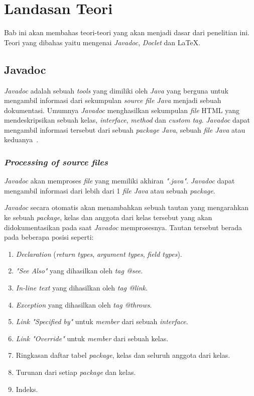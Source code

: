 \lstset{style=mystyle}
\chapter{Landasan Teori}
\label{chap:teori}
Bab ini akan membahas teori-teori yang akan menjadi dasar dari penelitian ini. Teori yang dibahas yaitu mengenai {\it Javadoc}, {\it Doclet} dan \LaTeX .

\section{Javadoc}
\label{sec:javadoc} 
{\it Javadoc} adalah sebuah {\it tools} yang dimiliki oleh {\it Java} yang berguna untuk mengambil informasi dari sekumpulan {\it source file Java} menjadi sebuah dokumentasi. Umumnya {\it Javadoc} menghasilkan sekumpulan {\it file} HTML yang mendeskripsikan sebuah kelas, {\it interface}, {\it method} dan {\it custom tag}. {\it Javadoc} dapat mengambil informasi tersebut dari sebuah {\it package Java}, sebuah {\it file Java} atau keduanya~\cite{javadoc:01:javadoc}.

\subsection{\textit{Processing of source files}}
\label{sec:javadoc}
{\it Javadoc} akan memproses {\it file} yang memiliki akhiran {\it ".java"}. {\it Javadoc} dapat mengambil informasi dari lebih dari 1 {\it file Java} atau sebuah {\it package}.

{\it Javadoc} secara otomatis akan menambahkan sebuah tautan yang mengarahkan ke sebuah {\it package}, kelas dan anggota dari kelas tersebut yang akan didokumentasikan pada saat {\it Javadoc} memprosesnya. Tautan tersebut berada pada beberapa posisi seperti:
\begin{enumerate}
	\item {\it Declaration} ({\it return types}, {\it argument types}, {\it field types}).
	\item {\it "See Also"} yang dihasilkan oleh {\it tag @see}.
	\item {\it In-line text} yang dihasilkan oleh {\it tag {@link}}.
	\item {\it Exception} yang dihasilkan oleh {\it tag @throws}.
	\item {\it Link "Specified by"} untuk {\it member} dari sebuah {\it interface}.
	\item {\it Link "Override"} untuk {\it member} dari sebuah kelas.
	\item Ringkasan daftar tabel {\it package}, kelas dan seluruh anggota dari kelas.
	\item Turunan dari setiap {\it package} dan kelas.
	\item Indeks.
\end{enumerate}

